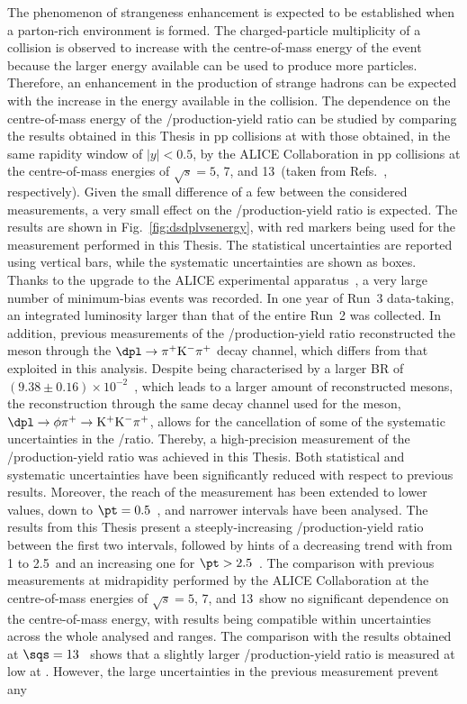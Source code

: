 The phenomenon of strangeness enhancement is expected to be established when a parton-rich environment is formed. The charged-particle multiplicity of a collision is observed to increase with the centre-of-mass energy of the event~\cite{ALICE:2020swj} because the larger energy available can be used to produce more particles. Therefore, an enhancement in the production of strange hadrons can be expected with the increase in the energy available in the collision. The dependence on the centre-of-mass energy of the \ds/\dpl production-yield ratio can be studied by comparing the results obtained in this Thesis in pp collisions at \thirteen with those obtained, in the same rapidity window of \mbox{$\lvert y\rvert<0.5$}, by the ALICE Collaboration in pp collisions at the centre-of-mass energies of $\sqrt{s} = 5$, 7, and 13~\tev (taken from Refs.~\cite{ALICE:2021mgk,ALICE:2017olh,ALICE:2023sgl}, respectively). Given the small difference of a few \tev between the considered measurements, a very small effect on the \ds/\dpl production-yield ratio is expected. The results are shown in Fig.~\ref{fig:dsdplvsenergy}, with red markers being used for the measurement performed in this Thesis. The statistical uncertainties are reported using vertical bars, while the systematic uncertainties are shown as boxes. Thanks to the upgrade to the ALICE experimental apparatus~\cite{ALICE:2023udb}, a very large number of minimum-bias events was recorded. In one year of Run~3 data-taking, an integrated luminosity larger than that of the entire Run~2 was collected. In addition, previous measurements of the \ds/\dpl production-yield ratio reconstructed the \dpl meson through the $\dpl\rightarrow\pi^+\mathrm{K}^-\pi^+$ decay channel, which differs from that exploited in this analysis. Despite being characterised by a larger BR of \mbox{$(9.38\pm0.16)\times10^{-2}$}~\cite{pdg}, which leads to a larger amount of reconstructed \dpl mesons, the reconstruction through the same decay channel used for the \ds meson, $\dpl \rightarrow \mathrm{\phi\pi^+ \rightarrow K^+K^-\pi^+}$, allows for the cancellation of some of the systematic uncertainties in the \ds/\dpl ratio. Thereby, a high-precision measurement of the \ds/\dpl production-yield ratio was achieved in this Thesis. Both statistical and systematic uncertainties have been significantly reduced with respect to previous results. Moreover, the \pt reach of the measurement has been extended to lower values, down to $\pt=0.5$~\gevc, and narrower \pt intervals have been analysed. The results from this Thesis present a steeply-increasing \ds/\dpl production-yield ratio between the first two \pt intervals, followed by hints of a decreasing trend with \pt from 1 to 2.5~\gevc and an increasing one for $\pt>2.5$~\gevc. The comparison with previous measurements at midrapidity performed by the ALICE Collaboration at the centre-of-mass energies of $\sqrt{s} = 5$, 7, and 13~\tev show no significant dependence on the centre-of-mass energy, with results being compatible within uncertainties across the whole analysed \pt and \sqs ranges. The comparison with the results obtained at \mbox{$\sqs=13$~\tev} shows that a slightly larger \ds/\dpl production-yield ratio is measured at low \pt at \mbox{\thirteen}. However, the large uncertainties in the previous measurement prevent any 